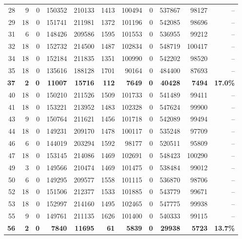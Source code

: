 \documentclass[conference,twoside]{IEEEtran}
\begin{document}
\begin{table}[h]
\begin{tabular}{rrrrrrrrrrr}
28 & 9  & 0 & 150352 & 210133 & 1413 & 100494 & 0 & 537867 & 98127 & -- \\
29 &  18 & 0 & 151741 & 211981 & 1372 & 101196 & 0 & 542085 & 98696 & -- \\
31 & 6  & 0 & 148426 & 209586 & 1595 & 101553 & 0 & 536955 & 99212 & -- \\
32 &  18 & 0 & 152732 & 214500 & 1487 & 102834 & 0 & 548719 & 100417 & -- \\
34 &  18 & 0 & 152184 & 211835 & 1351 & 100990 & 0 & 542202 & 98520 & -- \\
35 &  18 & 0 & 135616 & 188128 & 1701 & 90164  & 0 & 484400 & 87693 & -- \\
\textbf{37} & \textbf{2} & \textbf{0} & \textbf{11007}  & \textbf{15716}  & \textbf{112}  & \textbf{7649}   & \textbf{0} & \textbf{40428}  & \textbf{7494} & \textbf{17.0\%}  \\
40 &  18 & 0 & 150210 & 211526 & 1509 & 101733 & 0 & 541489 & 99411 & -- \\
41 & 18  & 0 & 153221 & 213952 & 1483 & 102328 & 0 & 547624 & 99900 & -- \\
43 &  9 & 0 & 150764 & 211621 & 1456 & 101718 & 0 & 542089 & 99494 & -- \\
44 & 18 & 0 & 149231 & 209170 & 1478 & 100117 & 0 & 535248 & 97709 & -- \\
46 & 6 & 0 & 144019 & 203294 & 1592 & 98177  & 0 & 520511 & 95809 & -- \\
47 & 18  & 0 & 153145 & 214086 & 1469 & 102691 & 0 & 548423 & 100290 & -- \\
49 & 3  & 0 & 149566 & 210474 & 1469 & 101475 & 0 & 538484 & 99012 & -- \\
50 & 6  & 0 & 149295 & 209577 & 1558 & 101115 & 0 & 536870 & 98706 & -- \\
52 &  18 & 0 & 151506 & 212377 & 1533 & 101885 & 0 & 543779 & 99671 & -- \\
53 & 18  & 0 & 152997 & 214160 & 1495 & 102465 & 0 & 547775 & 99938 & -- \\
55 &  9 & 0 & 149761 & 211135 & 1626 & 101400 & 0 & 540333 & 99115 & -- \\
\textbf{56} &\textbf{2} & \textbf{0} & \textbf{7840}   & \textbf{11695}  & \textbf{61}   & \textbf{5839}   & \textbf{0} & \textbf{29938}  & \textbf{5723} & \textbf{13.7\%}  \\
\bottomrule
\end{tabular}
\end{table}
\end{document}
